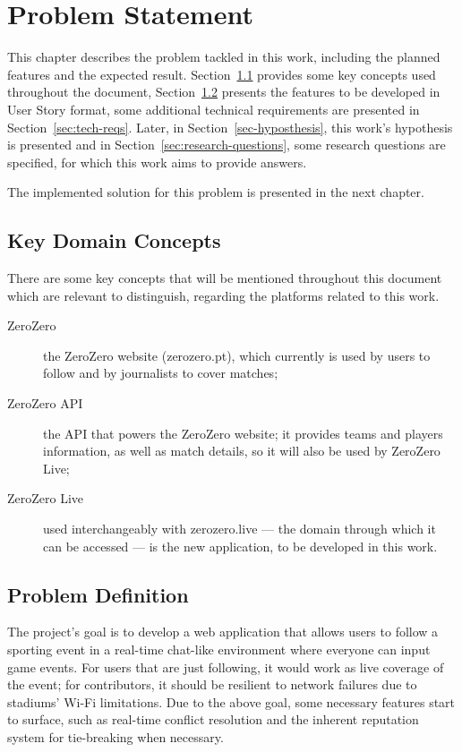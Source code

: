 \chapter{Problem Statement}\label{chap:problem}


This chapter describes the problem tackled in this work, including the planned features and the expected result. Section~\ref{sec:key-concepts} provides some key concepts used throughout the document, Section~\ref{sec:prob-def} presents the features to be developed in User Story format, some additional technical requirements are presented in Section~\ref{sec:tech-reqs}. Later, in Section~\ref{sec-hyposthesis}, this work's hypothesis is presented and in Section~\ref{sec:research-questions}, some research questions are specified, for which this work aims to provide answers.

The implemented solution for this problem is presented in the next chapter.  

\section{Key Domain Concepts}\label{sec:key-concepts}
There are some key concepts that will be mentioned throughout this document which are relevant to distinguish, regarding the platforms related to this work.
\begin{description}
    \item[ZeroZero] the ZeroZero website (zerozero.pt), which currently is used by users to follow and by journalists to cover matches;
    \item[ZeroZero API] the API that powers the ZeroZero website; it provides teams and players information, as well as match details, so it will also be used by ZeroZero Live;
    \item[ZeroZero Live] used interchangeably with zerozero.live --- the domain through which it can be accessed --- is the new application, to be developed in this work.
\end{description}

\section{Problem Definition}\label{sec:prob-def}

The project's goal is to develop a web application that allows users to follow a sporting event in a real-time chat-like environment where everyone can input game events. For users that are just following, it would work as live coverage of the event; for contributors, it should be resilient to network failures due to stadiums' Wi-Fi limitations.
Due to the above goal, some necessary features start to surface, such as real-time conflict resolution and the inherent reputation system for tie-breaking when necessary. 

